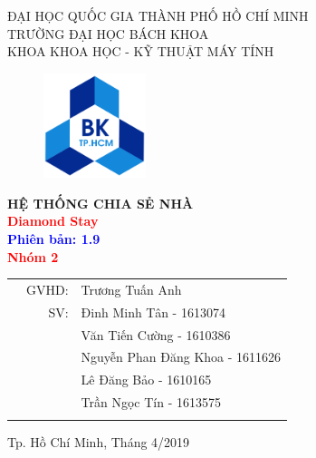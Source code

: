 \documentclass[a4paper]{article}
\begin{document}
\begin{titlepage}
\begin{center}
ĐẠI HỌC QUỐC GIA THÀNH PHỐ HỒ CHÍ MINH \\
TRƯỜNG ĐẠI HỌC BÁCH KHOA \\
KHOA KHOA HỌC - KỸ THUẬT MÁY TÍNH 
\end{center}

\vspace{1cm}

\begin{figure}[h!]
\begin{center}
\includegraphics[width=3cm]{Image/hcmut.png}
\end{center}
\end{figure}

\vspace{0.5cm}

\begin{center}
\textbf{\huge HỆ THỐNG CHIA SẺ NHÀ}\\
\vspace{0.25cm}
\textbf{\Huge \textcolor{red}{Diamond Stay}}\\
\textbf{\huge \textcolor{blue}{Phiên bản: 1.9}}\\
\vspace{1.5cm}
\textcolor{red}{\textbf{\huge  Nhóm 2}}

\end{center}

\vspace{0.7cm}


\begin{table}[h]
\begin{tabular}{rrl}
\hspace{5 cm} & GVHD: & Trương Tuấn Anh\\
& SV: & Đinh Minh Tân - 1613074 \\
& & Văn Tiến Cường - 1610386\\
& & Nguyễn Phan Đăng Khoa - 1611626\\
& & Lê Đăng Bảo - 1610165\\
& & Trần Ngọc Tín - 1613575\\
\vspace{2.3cm}

\end{tabular}
\end{table}

\begin{center}
{\footnotesize Tp. Hồ Chí Minh, Tháng 4/2019}
\end{center}
\end{titlepage}
\end{document}
